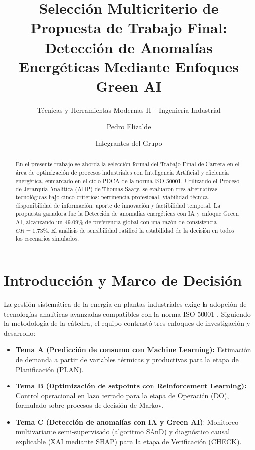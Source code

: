 \documentclass[runningheads]{llncs}
\begin{document}
\title{Selección Multicriterio de Propuesta de Trabajo Final: Detección de Anomalías Energéticas Mediante Enfoques Green AI}
\subtitle{Técnicas y Herramientas Modernas II -- Ingeniería Industrial}

\author{Pedro Elizalde \and Integrantes del Grupo}

\maketitle

\begin{abstract}
En el presente trabajo se aborda la selección formal del Trabajo Final de Carrera en el área de optimización de procesos industriales con Inteligencia Artificial y eficiencia energética, enmarcado en el ciclo PDCA de la norma ISO 50001. Utilizando el Proceso de Jerarquía Analítica (AHP) de Thomas Saaty, se evaluaron tres alternativas tecnológicas bajo cinco criterios: pertinencia profesional, viabilidad técnica, disponibilidad de información, aporte de innovación y factibilidad temporal. La propuesta ganadora fue la Detección de anomalías energéticas con IA y enfoque Green AI, alcanzando un 49.09\% de preferencia global con una razón de consistencia $CR = 1.73\%$. El análisis de sensibilidad ratificó la estabilidad de la decisión en todos los escenarios simulados.

\end{abstract}

\section{Introducción y Marco de Decisión}
La gestión sistemática de la energía en plantas industriales exige la adopción de tecnologías analíticas avanzadas compatibles con la norma ISO 50001 \cite{iso50001}. Siguiendo la metodología de la cátedra, el equipo contrastó tres enfoques de investigación y desarrollo:
\begin{itemize}
    \item \textbf{Tema A (Predicción de consumo con Machine Learning):} Estimación de demanda a partir de variables térmicas y productivas para la etapa de Planificación (PLAN).
    \item \textbf{Tema B (Optimización de setpoints con Reinforcement Learning):} Control operacional en lazo cerrado para la etapa de Operación (DO), formulado sobre procesos de decisión de Markov.
    \item \textbf{Tema C (Detección de anomalías con IA y Green AI):} Monitoreo multivariante semi-supervisado (algoritmo SAnD) y diagnóstico causal explicable (XAI mediante SHAP) para la etapa de Verificación (CHECK).
\end{itemize}
\end{document}
